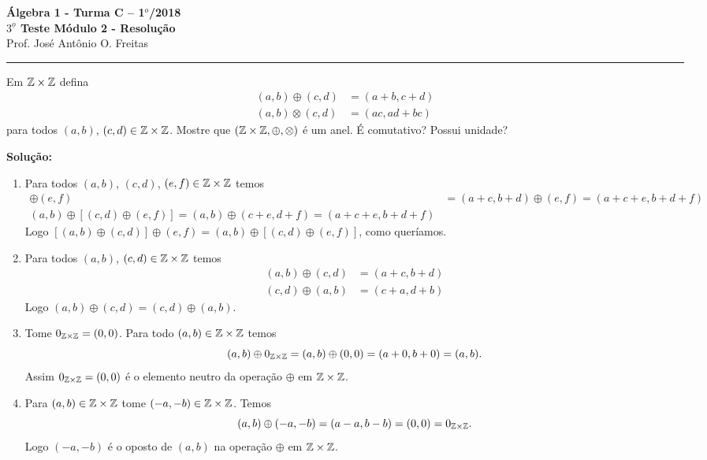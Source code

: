 \documentclass[12pt]{article}
\begin{document}


\begin{center}
{\Large\bf {\'A}lgebra 1 - Turma C -- 1$^{o}$/2018} \\ \vspace{9pt} {\large\bf
  $3^{\underline{o}}$ Teste M\'odulo 2 - Resolu\c{c}\~ao}\\
\vspace{9pt} Prof. Jos{\'e} Ant{\^o}nio O. Freitas
\end{center}
\hrule

\vspace{.6cm}

\questao Em $\mathbb{Z} \times \mathbb{Z}$ defina
\begin{align*}
	(a, b) \oplus (c,d) &= (a + b, c + d)\\
	(a, b) \otimes (c, d) &= (ac, ad + bc)
\end{align*}
para todos $(a, b)$, $(c, d) \in \mathbb{Z} \times \mathbb{Z}$. Mostre que $(\mathbb{Z} \times \mathbb{Z}, \oplus, \otimes)$ é um anel. É comutativo? Possui unidade?

\noindent\textbf{Solu\c{c}\~ao:}

	\begin{enumerate}
		\item Para todos $(a, b)$, $(c, d)$, $(e, f) \in \mathbb{Z} \times \mathbb{Z}$ temos
		\begin{align*}
			[(a, b) \oplus (c, d)] \oplus (e, f) &= (a + c, b + d) \oplus (e, f) = (a + c + e, b + d + f)\\
			(a, b) \oplus [(c, d) \oplus (e, f)] = (a, b) \oplus (c + e, d + f) = (a + c + e, b + d + f)
		\end{align*}
		Logo $[(a, b) \oplus (c, d)] \oplus (e, f) = (a, b) \oplus [(c, d) \oplus (e, f)]$, como queríamos.

		\item Para todos $(a, b)$, $(c, d) \in \mathbb{Z} \times \mathbb{Z}$ temos
		\begin{align*}
			(a, b) \oplus (c, d) &= (a + c, b + d)\\
			(c, d) \oplus (a, b) &= (c + a, d + b)
		\end{align*}
		Logo $(a, b) \oplus (c, d) = (c, d) \oplus (a, b)$.

		\item Tome $0_{\mathbb{Z} \times \mathbb{Z}} = (0, 0)$. Para todo $(a, b) \in \mathbb{Z} \times \mathbb{Z}$ temos
		\[
			(a, b) \oplus 0_{\mathbb{Z} \times \mathbb{Z}} = (a, b) \oplus (0, 0) = (a + 0, b + 0) = (a, b).
		\]
		Assim $0_{\mathbb{Z} \times \mathbb{Z}} = (0, 0)$ é o elemento neutro da operação $\oplus$ em $\mathbb{Z} \times \mathbb{Z}$.

		\item Para $(a, b) \in \mathbb{Z} \times \mathbb{Z}$ tome $(-a, -b) \in \mathbb{Z} \times \mathbb{Z}$. Temos
		\[
			(a, b) \oplus (-a, -b) = (a - a, b - b) = (0, 0) = 0_{\mathbb{Z} \times \mathbb{Z}}.
		\]
		Logo $(-a, -b)$ é o oposto de $(a, b)$ na operação $\oplus$ em $\mathbb{Z} \times \mathbb{Z}$.
	\end{enumerate}
\end{document}

